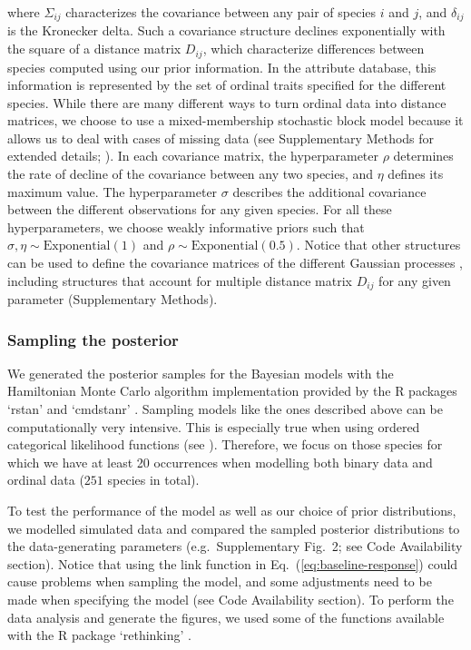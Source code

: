 \documentclass[11pt, a4paper]{article}
\begin{document}
where $\Sigma_{ij}$ characterizes the covariance between any pair of species $i$ and $j$, and $\delta_{ij}$ is the Kronecker delta. Such a covariance structure declines exponentially with the square of a distance matrix $D_{ij}$, which characterize differences between species computed using our prior information. In the attribute database, this information is represented by the set of ordinal traits specified for the different species. While there are many different ways to turn ordinal data into distance matrices, we choose to use a mixed-membership stochastic block model because it allows us to deal with cases of missing data (see Supplementary Methods for extended details; \citealt{godoy-loriteAccurateScalableSocial2016}). In each covariance matrix, the hyperparameter $\rho$ determines the rate of decline of the covariance between any two species, and $\eta$ defines its maximum value. The hyperparameter $\sigma$ describes the additional covariance between the different observations for any given species. For all these hyperparameters, we choose weakly informative priors such that $\sigma , \eta \sim \text{Exponential}\left(1\right)$ and $\rho\sim \text{Exponential}\left(0.5\right)$. Notice that other structures can be used to define the covariance matrices of the different Gaussian processes \citep{mcelreathStatisticalRethinkingBayesian2020}, including structures that account for multiple distance matrix $D_{ij}$ for any given parameter (Supplementary Methods).

\subsubsection*{Sampling the posterior}
We generated the posterior samples for the Bayesian models with the Hamiltonian Monte Carlo algorithm implementation provided by the R packages `rstan' and `cmdstanr' \citep{standevelopentteamRStanInterfaceStan2021}. Sampling models like the ones described above can be computationally very intensive. This is especially true when using ordered categorical likelihood functions (see \citealt{standevelopmentteamStanModelingLanguage2021}). Therefore, we focus on those species for which we have at least 20 occurrences when modelling both binary data and ordinal data ($251$ species in total).

To test the performance of the model as well as our choice of prior distributions, we modelled simulated data and compared the sampled posterior distributions to the data-generating parameters (e.g.~Supplementary Fig.~2; see Code Availability section). Notice that using the link function in Eq.~(\ref{eq:baseline-response}) could cause problems when sampling the model, and some adjustments need to be made when specifying the model (see Code Availability section). To perform the data analysis and generate the figures, we used some of the functions available with the R package `rethinking' \citep{mcelreathStatisticalRethinkingBayesian2020}.
\end{document}
